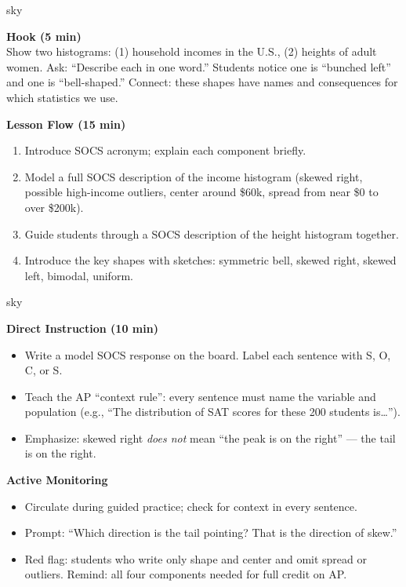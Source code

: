 \documentclass[10pt]{article}
\begin{document}
\begin{skillbox}{sky}
\begin{minipage}[t]{0.48\linewidth}
    \textbf{Hook (5 min)}\\
    Show two histograms: (1) household incomes in the U.S., (2) heights of adult women. Ask: ``Describe each in one word.'' Students notice one is ``bunched left'' and one is ``bell-shaped.'' Connect: these shapes have names and consequences for which statistics we use.
\end{minipage}
\hfill
\begin{minipage}[t]{0.48\linewidth}
    \textbf{Lesson Flow (15 min)}
    \begin{enumerate}
        \item Introduce SOCS acronym; explain each component briefly.
        \item Model a full SOCS description of the income histogram (skewed right, possible high-income outliers, center around \$60k, spread from near \$0 to over \$200k).
        \item Guide students through a SOCS description of the height histogram together.
        \item Introduce the key shapes with sketches: symmetric bell, skewed right, skewed left, bimodal, uniform.
    \end{enumerate}
\end{minipage}
\end{skillbox}

\begin{skillbox}{sky}
\begin{minipage}[t]{0.48\linewidth}
    \textbf{Direct Instruction (10 min)}
    \begin{itemize}
        \item Write a model SOCS response on the board. Label each sentence with S, O, C, or S.
        \item Teach the AP ``context rule'': every sentence must name the variable and population (e.g., ``The distribution of SAT scores for these 200 students is\ldots'').
        \item Emphasize: skewed right \textit{does not} mean ``the peak is on the right'' --- the tail is on the right.
    \end{itemize}
\end{minipage}
\hfill
\begin{minipage}[t]{0.48\linewidth}
    \textbf{Active Monitoring}
    \begin{itemize}
        \item Circulate during guided practice; check for context in every sentence.
        \item Prompt: ``Which direction is the tail pointing? That is the direction of skew.''
        \item Red flag: students who write only shape and center and omit spread or outliers. Remind: all four components needed for full credit on AP.
    \end{itemize}
\end{minipage}
\end{skillbox}
\end{document}
